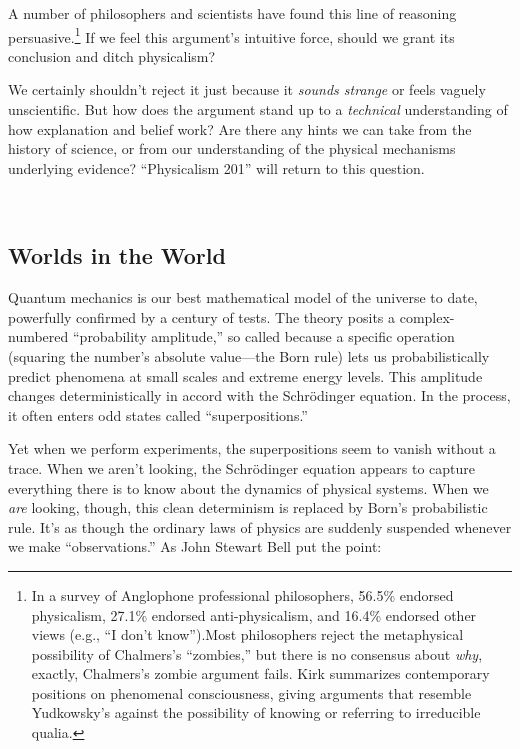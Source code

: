 {
 A number of philosophers and scientists have found this line of
reasoning persuasive.\footnote{In a survey of Anglophone professional philosophers, 56.5\%
endorsed physicalism, 27.1\% endorsed anti-physicalism, and 16.4\%
endorsed other views (e.g., ``I don't
know'').\footnotemark Most philosophers reject
the metaphysical possibility of Chalmers's
``zombies,'' but there is no
consensus about \textit{why}, exactly, Chalmers's
zombie argument fails. Kirk summarizes contemporary positions on
phenomenal consciousness, giving arguments that resemble
Yudkowsky's against the possibility of knowing or
referring to irreducible qualia.\footnotemark{}}
\footnext{}
\footnext{}
If we feel this
argument's intuitive force, should we grant its
conclusion and ditch physicalism?}

{
 We certainly shouldn't reject it just because it
\textit{sounds strange} or feels vaguely unscientific. But how does the
argument stand up to a \textit{technical} understanding of how
explanation and belief work? Are there any hints we can take from the
history of science, or from our understanding of the physical
mechanisms underlying evidence? ``Physicalism
201'' will return to this question.}

{
 ~}

\subsection{Worlds in the World}

{
 Quantum mechanics is our best mathematical model of the universe
to date, powerfully confirmed by a century of tests. The theory posits
a complex-numbered ``probability
amplitude,'' so called because a specific operation
(squaring the number's absolute value---the Born rule)
lets us probabilistically predict phenomena at small scales and extreme
energy levels. This amplitude changes deterministically in accord with
the Schrödinger equation. In the process, it often enters odd states
called ``superpositions.''}

{
 Yet when we perform experiments, the superpositions seem to vanish
without a trace. When we aren't looking, the
Schrödinger equation appears to capture everything there is to know
about the dynamics of physical systems. When we \textit{are} looking,
though, this clean determinism is replaced by Born's
probabilistic rule. It's as though the ordinary laws of
physics are suddenly suspended whenever we make
``observations.'' As John Stewart
Bell put the point:}

